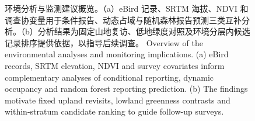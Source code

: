\begin{figure}[htbp]\centering{}
\caption{\ifzh
环境分析与监测建议概览。（a）eBird 记录、SRTM 海拔、NDVI 和调查协变量用于条件报告、动态占域与随机森林报告预测三类互补分析。（b）分析结果为固定山地复访、低地绿度对照及环境分层内候选记录排序提供依据，以指导后续调查。
\else
Overview of the environmental analyses and monitoring implications. (a) eBird records, SRTM elevation, NDVI and survey covariates inform complementary analyses of conditional reporting, dynamic occupancy and random forest reporting prediction. (b) The findings motivate fixed upland revisits, lowland greenness contrasts and within-stratum candidate ranking to guide follow-up surveys.
\fi}\label{fig:arch}
\end{figure}
\FloatBarrier

